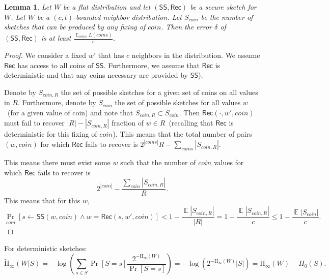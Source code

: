 \documentclass[11pt]{article}
\DeclareMathOperator*{\expe}{\mathbb{E}}
\newcommand{\class}[1]{{\ensuremath{\mathsf{#1}}}}
\newcommand{\sketch}{\ensuremath{\class{SS}}\xspace}
\newcommand{\rec}{\ensuremath{\class{Rec}}\xspace}
\newcommand{\Hoo}{\mathrm{H}_\infty}
\newcommand{\Hav}{\tilde{\mathrm{H}}_\infty}
\newtheorem{lemma}[theorem]{Lemma}
\begin{document}
\begin{lemma}
Let $W$ be a flat distribution and let $(\sketch, \rec)$ be a secure sketch for $W$.  Let $W$ be a $(c, t)$-bounded neighbor distribution.  Let $S_{coin}$ be the number of sketches that can be produced by any fixing of $coin$.  Then the error $\delta$ of $(\sketch, \rec)$ is at least $\frac{\expe_{coins}L(coins)}{c}$.  
\end{lemma}
\begin{proof}
We consider a fixed $w'$ that has $c$ neighbors in the distribution.  We assume $\rec$ has access to all coins of $\sketch$.  Furthermore, we assume that $\rec$ is deterministic and that any coins necessary are provided by $\sketch$).  

Denote by $S_{coin, R}$ the set of possible sketches for a given set of coins on all values in $R$.  Furthermore, denote by $S_{coin}$ the set of possible sketches for all values $w$~(for a given value of coin) and note that $S_{coin, R} \subset S_{coin}$.  Then $\rec(\cdot, w', coin)$ must fail to recover $|R|-|S_{coin, R}|$ fraction of $w\in R$~(recalling that $\rec$ is deterministic for this fixing of $coin$).  This means that the total number of pairs $(w, coin)$ for which $\rec$ fails to recover is $2^{|coins|}R - \sum_{coins} |S_{coin, R}|$.

This means there must exist some $w$ such that the number of $coin$ values for which $\rec$ fails to recover is 
\[
2^{|coin|} - \frac{\sum_{coin} |S_{coin, R}|}{R}.
\]
 This means that for this $w$, 
\[
\Pr_{coin}[s \leftarrow \sketch(w, coin) \wedge w = \rec(s, w', coin)] < 1- \frac{\expe |S_{coin, R}|}{|R|} = 1-\frac{\expe |S_{coin, R}|}{c} \le 1-\frac{\expe |S_{coin}| }{c}.
\]

\end{proof}

For deterministic sketches:
\[
\Hav(W|S ) = -\log \left(\sum_{s\in S} \Pr[S = s] \frac{2^{-\Hoo(W)}}{\Pr[S=s]}\right) = -\log \left(2^{-\Hoo(W)} |S| \right)  = \Hoo(W) - H_0(S).
\]
\end{document}
